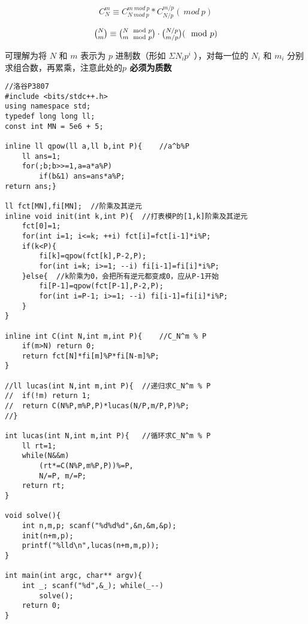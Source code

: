 $$C_N^m \equiv C_{N\ mod\ p}^{m\ mod\ p} * C_{N/p}^{m/p}(\ mod\ p)$$

$$\tbinom N m \equiv \tbinom{N\mod p}{m\mod p} \cdot \tbinom{N/p}{m/p}(\mod p)$$

可理解为将 $N$ 和 $m$ 表示为 $p$ 进制数（形如 $\Sigma N_ip^i$ ），对每一位的 $N_i$ 和 $m_i$ 分别求组合数，再累乘，注意此处的\textbf{$p$ 必须为质数}

\begin{lstlisting}
//洛谷P3807 
#include <bits/stdc++.h>
using namespace std;
typedef long long ll;
const int MN = 5e6 + 5;

inline ll qpow(ll a,ll b,int P){	//a^b%P 
	ll ans=1;
	for(;b;b>>=1,a=a*a%P)
		if(b&1) ans=ans*a%P;
return ans;}

ll fct[MN],fi[MN];	//阶乘及其逆元
inline void init(int k,int P){	//打表模P的[1,k]阶乘及其逆元
	fct[0]=1;
	for(int i=1; i<=k; ++i) fct[i]=fct[i-1]*i%P;
	if(k<P){
		fi[k]=qpow(fct[k],P-2,P);
		for(int i=k; i>=1; --i) fi[i-1]=fi[i]*i%P;
	}else{	//k阶乘为0，会把所有逆元都变成0，应从P-1开始
		fi[P-1]=qpow(fct[P-1],P-2,P);
		for(int i=P-1; i>=1; --i) fi[i-1]=fi[i]*i%P;
	}
}

inline int C(int N,int m,int P){	//C_N^m % P
	if(m>N) return 0;
	return fct[N]*fi[m]%P*fi[N-m]%P;
}

//ll lucas(int N,int m,int P){	//递归求C_N^m % P
//	if(!m) return 1;
//	return C(N%P,m%P,P)*lucas(N/P,m/P,P)%P;
//}

int lucas(int N,int m,int P){	//循环求C_N^m % P
	ll rt=1;
	while(N&&m)
		(rt*=C(N%P,m%P,P))%=P,
		N/=P, m/=P;
	return rt;
}

void solve(){
	int n,m,p; scanf("%d%d%d",&n,&m,&p);
	init(n+m,p);
	printf("%lld\n",lucas(n+m,m,p));
}

int main(int argc, char** argv){ 
	int _; scanf("%d",&_); while(_--)
		solve();
	return 0;
}
\end{lstlisting}